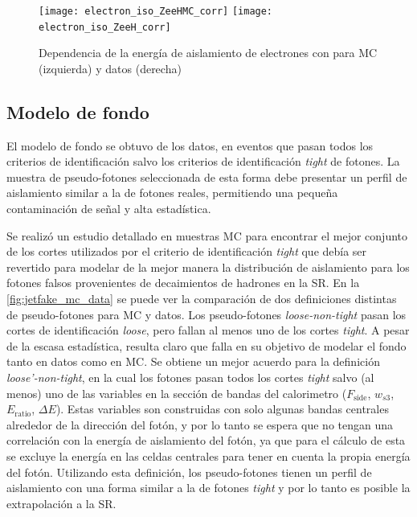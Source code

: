 \begin{figure}[!htb]
  \centering

  \texttt{[image: electron\_iso\_ZeeHMC\_corr]}
  \texttt{[image: electron\_iso\_ZeeH\_corr]}

  \caption{Dependencia de la energía de aislamiento de electrones con {\HT}
    para MC (izquierda) y datos (derecha) \Zee}
    \label{fig:electron_iso_HT}

\end{figure}



\subsection{Modelo de fondo} \label{sec:jfake_bkg_template}

El modelo de fondo se obtuvo de los datos, en eventos que pasan todos los
criterios de identificación salvo los criterios de identificación \emph{tight}
de fotones. La muestra de pseudo-fotones seleccionada de esta forma debe
presentar un perfil de aislamiento similar a la de fotones reales, permitiendo
una pequeña contaminación de señal y alta estadística.

Se realizó un estudio detallado en muestras MC para encontrar el mejor conjunto
de los cortes utilizados por el criterio de identificación \emph{tight} que debía ser
revertido para modelar de la mejor manera la distribución de aislamiento para
los fotones falsos provenientes de decaimientos de hadrones en la SR. En la
\cref{fig:jetfake_mc_data} se puede ver la comparación de dos definiciones
distintas de pseudo-fotones para MC y datos.
Los pseudo-fotones \emph{loose-non-tight} pasan los cortes de
identificación \emph{loose}, pero fallan al menos uno de los cortes
\emph{tight}. A pesar de la escasa estadística, resulta claro que falla en su
objetivo de modelar el fondo tanto en datos como en MC. Se obtiene un mejor
acuerdo para la definición \emph{loose'-non-tight}, en la cual los
fotones pasan todos los cortes \emph{tight} salvo (al menos) uno de las
variables en la sección de bandas del calorimetro ($F_\text{side}$, $w_{s3}$, $E_\text{ratio}$,
$\Delta E$). Estas variables son construidas con solo algunas bandas centrales
alrededor de la dirección del fotón, y por lo tanto se espera que no tengan una
correlación con la energía de aislamiento del fotón, ya que para el cálculo de
esta se excluye la energía en las celdas centrales para tener en cuenta la
propia energía del fotón. Utilizando esta definición, los pseudo-fotones tienen
un perfil de aislamiento con una forma similar a la de fotones \emph{tight} y
por lo tanto es posible la extrapolación a la SR.

